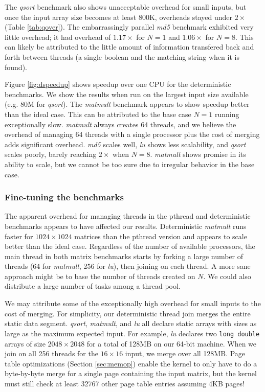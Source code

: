 The \emph{qsort} benchmark also shows unacceptable overhead for small inputs,
but once the input array size becomes at least 800K, overheads stayed under
$2\times$ (Table \ref{tab:qover}).
The embarrassingly parallel \emph{md5} benchmark exhibited very little overhead;
it had overhead of $1.17\times$ for $N=1$ and $1.06\times$ for $N=8$. This
can likely be attributed to the little amount of information transfered back and
forth between threads (a single boolean and the matching string when it is
found).


Figure \ref{fig:dspeedup} shows speedup over one CPU for the deterministic
benchmarks. We show the results when run on the largest input size available
(e.g. 80M for \emph{qsort}). The \emph{matmult} benchmark appears to show
speedup better than the ideal case. This can be attributed to the base case
$N=1$ running exceptionally slow. \emph{matmult} always creates 64 threads, and
we believe the overhead of managing 64 threads with a single processor plus the
cost of merging adds significant overhead. \emph{md5} scales well,
\emph{lu} shows less scalability, and \emph{qsort} scales poorly, barely
reaching $2\times$ when $N=8$. \emph{matmult} shows promise in its ability to
scale, but we cannot be too sure due to irregular behavior in the base case.

\subsubsection{Fine-tuning the benchmarks}
The apparent overhead for managing threads in the pthread and deterministic
benchmarks appears to have affected our results. Deterministic \emph{matmult}
runs faster for $1024\times 1024$ matrices than the pthread version and appears
to scale better than the ideal case. Regardless of the number of available
processors, the main thread in both matrix benchmarks starts by forking a large
number of threads (64 for \emph{matmult}, 256 for \emph{lu}), then joining on
each thread. A more sane approach might be to base the number of threads created
on $N$. We could also distribute a large number of tasks among a thread pool.

We may attribute some of the exceptionally high overhead for small inputs to
the cost of merging. For simplicity, our deterministic thread join merges the
entire static data segment. \emph{qsort}, \emph{matmult}, and \emph{lu} all
declare static arrays with sizes as large as the maximum expected input. For
example, \emph{lu} declares two {\tt long double} arrays of size
$2048\times 2048$ for a total of 128MB on our 64-bit machine. When we join on
all 256 threads for the $16\times 16$ input, we merge over all 128MB. Page
table optimizations (Section \ref{sec:memop}) enable the kernel to only have to
do a \mbox{byte-by-byte} merge for a single page containing the input matrix,
but the kernel must still check at least 32767 other page table entries assuming
4KB pages!


